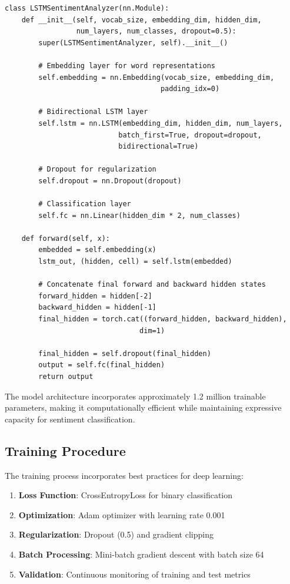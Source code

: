\documentclass[a4paper, journal]{IEEEtran}
\begin{document}
\begin{lstlisting}[caption=LSTM Model Architecture]
class LSTMSentimentAnalyzer(nn.Module):
    def __init__(self, vocab_size, embedding_dim, hidden_dim, 
                 num_layers, num_classes, dropout=0.5):
        super(LSTMSentimentAnalyzer, self).__init__()
        
        # Embedding layer for word representations
        self.embedding = nn.Embedding(vocab_size, embedding_dim, 
                                     padding_idx=0)
        
        # Bidirectional LSTM layer
        self.lstm = nn.LSTM(embedding_dim, hidden_dim, num_layers, 
                           batch_first=True, dropout=dropout, 
                           bidirectional=True)
        
        # Dropout for regularization
        self.dropout = nn.Dropout(dropout)
        
        # Classification layer
        self.fc = nn.Linear(hidden_dim * 2, num_classes)
    
    def forward(self, x):
        embedded = self.embedding(x)
        lstm_out, (hidden, cell) = self.lstm(embedded)
        
        # Concatenate final forward and backward hidden states
        forward_hidden = hidden[-2]
        backward_hidden = hidden[-1]
        final_hidden = torch.cat((forward_hidden, backward_hidden), 
                                dim=1)
        
        final_hidden = self.dropout(final_hidden)
        output = self.fc(final_hidden)
        return output
\end{lstlisting}

The model architecture incorporates approximately 1.2 million trainable parameters, making it computationally efficient while maintaining expressive capacity for sentiment classification.

\subsection{Training Procedure}

The training process incorporates best practices for deep learning:

\begin{enumerate}
    \item \textbf{Loss Function}: CrossEntropyLoss for binary classification
    \item \textbf{Optimization}: Adam optimizer with learning rate 0.001
    \item \textbf{Regularization}: Dropout (0.5) and gradient clipping
    \item \textbf{Batch Processing}: Mini-batch gradient descent with batch size 64
    \item \textbf{Validation}: Continuous monitoring of training and test metrics
\end{enumerate}
\end{document}
